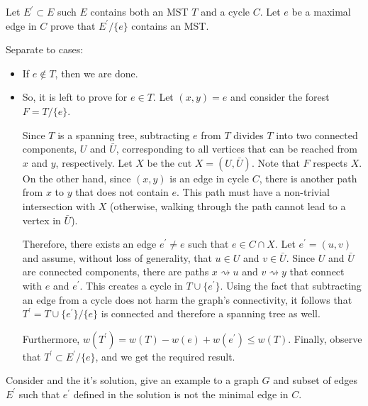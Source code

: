 \begin{problem}
  \label{problem:opkrus}
  Let $E^{\prime} \subset E$ such $E$ contains both an MST $T$ and a cycle $C$. Let $e$ be a maximal edge in $C$ prove that $E^{\prime}/ \{e\}$ contains an MST.  
\end{problem}

\begin{solution} Separate to cases:
  \begin{itemize}
    \item If $e \notin T$, then we are done.
    \item So, it is left to prove for $e \in T$. Let $(x,y) = e$ and consider the forest $F = T/\{e\}$.

Since $T$ is a spanning tree, subtracting $e$ from $T$ divides $T$ into two connected components, $U$ and $\bar{U}$, corresponding to all vertices that can be reached from $x$ and $y$, respectively. Let $X$ be the cut $X = (U, \bar{U})$. Note that $F$ respects $X$. On the other hand, since $(x,y)$ is an edge in cycle $C$, there is another path from $x$ to $y$ that does not contain $e$. This path must have a non-trivial intersection with $X$ (otherwise, walking through the path cannot lead to a vertex in $\bar{U}$).

Therefore, there exists an edge $e^{\prime} \neq e$ such that $e \in C \cap X$. Let $e^{\prime} = (u,v)$ and assume, without loss of generality, that $u \in U$ and $v \in \bar{U}$. Since $U$ and $\bar{U}$ are connected components, there are paths $x \rightsquigarrow u$ and $v \rightsquigarrow y$ that connect with $e$ and $e^{\prime}$. This creates a cycle in $T \cup \{e^{\prime}\}$. Using the fact that subtracting an edge from a cycle does not harm the graph's connectivity, it follows that $T^{\prime} = T \cup \{e^{\prime}\} / \{e\}$ is connected and therefore a spanning tree as well.

Furthermore, $w(T^{\prime}) = w(T) - w(e) + w(e^{\prime}) \leq w(T)$. Finally, observe that $T^{\prime} \subset E^{\prime} / \{e\}$, and we get the required result.
  \end{itemize}
\end{solution}


\begin{problem}
  Consider  and the it's solution, give an example to a graph $G$ and subset of edges $E^{\prime}$ such that $e^{\prime}$ defined in the solution is not the minimal edge in $C$. 
\end{problem}

